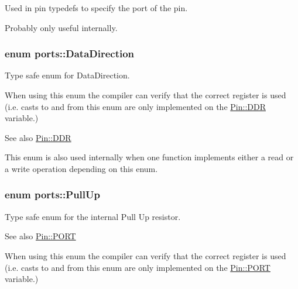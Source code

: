 Used in pin typedefs to specify the port of the pin. 

Probably only useful internally. 
\subsubsection[{\texorpdfstring{Data\+Direction}{DataDirection}}]{\setlength{\rightskip}{0pt plus 5cm}enum {\bf ports\+::\+Data\+Direction}\hspace{0.3cm}{\ttfamily [strong]}}\hypertarget{namespaceports_a46987e78fa447129742fadda5eccafb4}{}\label{namespaceports_a46987e78fa447129742fadda5eccafb4}


Type safe enum for Data\+Direction. 

When using this enum the compiler can verify that the correct register is used (i.\+e. casts to and from this enum are only implemented on the \hyperlink{structports_1_1Pin_aaebb4d6cb5db0635fe8e7d6e7d315c7f}{Pin\+::\+D\+DR} variable.)

\begin{DoxySeeAlso}{See also}
\hyperlink{structports_1_1Pin_aaebb4d6cb5db0635fe8e7d6e7d315c7f}{Pin\+::\+D\+DR}
\end{DoxySeeAlso}
This enum is also used internally when one function implements either a read or a write operation depending on this enum. 
\subsubsection[{\texorpdfstring{Pull\+Up}{PullUp}}]{\setlength{\rightskip}{0pt plus 5cm}enum {\bf ports\+::\+Pull\+Up}\hspace{0.3cm}{\ttfamily [strong]}}\hypertarget{namespaceports_a49bf0ccedb4cfed89a328574e53bec07}{}\label{namespaceports_a49bf0ccedb4cfed89a328574e53bec07}


Type safe enum for the internal Pull Up resistor. 

\begin{DoxySeeAlso}{See also}
\hyperlink{structports_1_1Pin_aaa08f0eb17ef31d9f46d65d50c8a093e}{Pin\+::\+P\+O\+RT}
\end{DoxySeeAlso}
When using this enum the compiler can verify that the correct register is used (i.\+e. casts to and from this enum are only implemented on the \hyperlink{structports_1_1Pin_aaa08f0eb17ef31d9f46d65d50c8a093e}{Pin\+::\+P\+O\+RT} variable.) 


